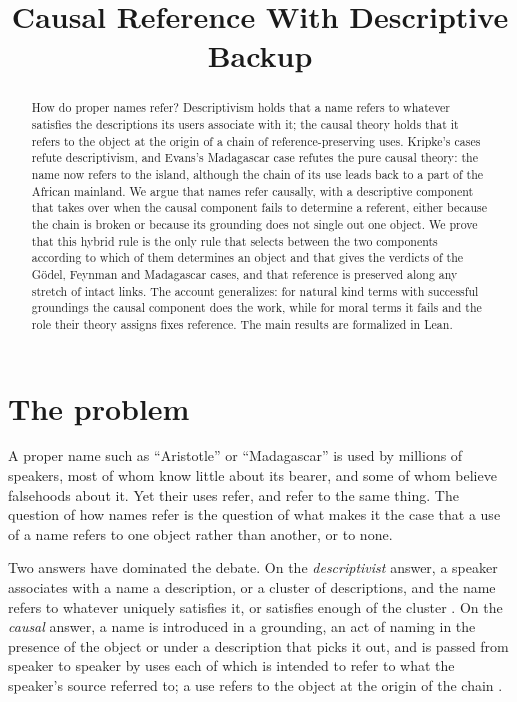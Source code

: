 \documentclass{situationist-preprint}
\title{Causal Reference With Descriptive Backup}
\begin{document}
\maketitle

\begin{abstract}
How do proper names refer? Descriptivism holds that a name refers to whatever satisfies the descriptions its users associate with it; the causal theory holds that it refers to the object at the origin of a chain of reference-preserving uses. Kripke's cases refute descriptivism, and Evans's Madagascar case refutes the pure causal theory: the name now refers to the island, although the chain of its use leads back to a part of the African mainland. We argue that names refer causally, with a descriptive component that takes over when the causal component fails to determine a referent, either because the chain is broken or because its grounding does not single out one object. We prove that this hybrid rule is the only rule that selects between the two components according to which of them determines an object and that gives the verdicts of the G\"odel, Feynman and Madagascar cases, and that reference is preserved along any stretch of intact links. The account generalizes: for natural kind terms with successful groundings the causal component does the work, while for moral terms it fails and the role their theory assigns fixes reference. The main results are formalized in Lean.
\end{abstract}

\section{The problem}

A proper name such as \enquote{Aristotle} or \enquote{Madagascar} is used by millions of speakers, most of whom know little about its bearer, and some of whom believe falsehoods about it. Yet their uses refer, and refer to the same thing. The question of how names refer is the question of what makes it the case that a use of a name refers to one object rather than another, or to none.

Two answers have dominated the debate. On the \emph{descriptivist} answer, a speaker associates with a name a description, or a cluster of descriptions, and the name refers to whatever uniquely satisfies it, or satisfies enough of the cluster \citep{Frege1892,Russell1905,Searle1958}. On the \emph{causal} answer, a name is introduced in a grounding, an act of naming in the presence of the object or under a description that picks it out, and is passed from speaker to speaker by uses each of which is intended to refer to what the speaker's source referred to; a use refers to the object at the origin of the chain \citep{Kripke1980,Donnellan1970,Devitt1981}.
\end{document}
